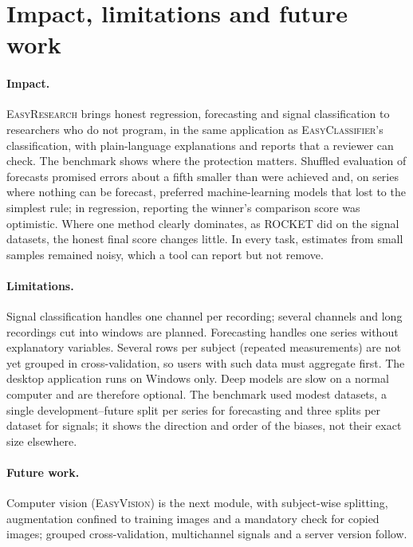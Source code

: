 \documentclass[11pt,a4paper]{article}
\newcommand{\ER}{\textsc{EasyResearch}}
\newcommand{\EC}{\textsc{EasyClassifier}}
\newcommand{\EV}{\textsc{EasyVision}}
\begin{document}
\section{Impact, limitations and future work}
\label{sec:impact}

\paragraph{Impact.} \ER{} brings honest regression, forecasting and signal classification to researchers who do not program, in the same application as \EC's classification, with plain-language explanations and reports that a reviewer can check. The benchmark shows where the protection matters. Shuffled evaluation of forecasts promised errors about a fifth smaller than were achieved and, on series where nothing can be forecast, preferred machine-learning models that lost to the simplest rule; in regression, reporting the winner's comparison score was optimistic. Where one method clearly dominates, as ROCKET did on the signal datasets, the honest final score changes little. In every task, estimates from small samples remained noisy, which a tool can report but not remove.

\paragraph{Limitations.} Signal classification handles one channel per recording; several channels and long recordings cut into windows are planned. Forecasting handles one series without explanatory variables. Several rows per subject (repeated measurements) are not yet grouped in cross-validation, so users with such data must aggregate first. The desktop application runs on Windows only. Deep models are slow on a normal computer and are therefore optional. The benchmark used modest datasets, a single development--future split per series for forecasting and three splits per dataset for signals; it shows the direction and order of the biases, not their exact size elsewhere.

\paragraph{Future work.} Computer vision (\EV) is the next module, with subject-wise splitting, augmentation confined to training images and a mandatory check for copied images; grouped cross-validation, multichannel signals and a server version follow.
\end{document}
